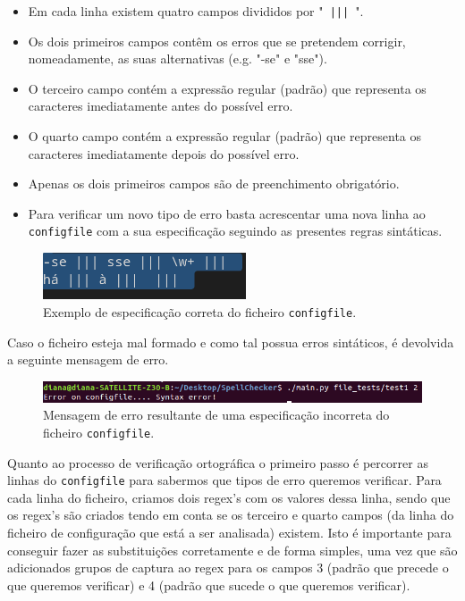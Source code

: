 \documentclass{article}
\begin{document}
\begin{itemize}
    \item Em cada linha existem quatro campos divididos por "\texttt{ ||| }".
    \item Os dois primeiros campos contêm os erros que se pretendem corrigir, nomeadamente, as suas alternativas (e.g. "-se" e "sse").
    \item O terceiro campo contém a expressão regular (padrão) que representa os caracteres imediatamente antes do possível erro.
    \item O quarto campo contém a expressão regular (padrão) que representa os caracteres imediatamente depois do possível erro.
    \item Apenas os dois primeiros campos são de preenchimento obrigatório.
    \item Para verificar um novo tipo de erro basta acrescentar uma nova linha ao \texttt{configfile} com a sua especificação seguindo as presentes regras sintáticas.
\end{itemize}

\begin{figure}[H]
\begin{center}
    \includegraphics[width = 6cm, keepaspectratio]{Pictures/cf.png}
    \caption{Exemplo de especificação correta do ficheiro \texttt{configfile}. }
\end{center}
\end{figure}

Caso o ficheiro esteja mal formado e como tal possua erros sintáticos, é devolvida a seguinte mensagem de erro.

\begin{figure}[H]
\begin{center}
    \includegraphics[width = 16cm, keepaspectratio]{Pictures/errocf.png}
    \caption{Mensagem de erro resultante de uma especificação incorreta do ficheiro \texttt{configfile}. }
\end{center}
\end{figure}

Quanto ao processo de verificação ortográfica o primeiro passo é percorrer as linhas do \texttt{configfile} para sabermos que tipos de erro queremos verificar. Para cada linha do ficheiro, criamos dois regex's com os valores dessa linha, sendo que os regex's são criados tendo em conta se os terceiro e quarto campos (da linha do ficheiro de configuração que está a ser analisada) existem. Isto é importante para conseguir fazer as substituições corretamente e de forma simples, uma vez que são adicionados grupos de captura ao regex para os campos 3 (padrão que precede o que queremos verificar) e 4 (padrão que sucede o que queremos verificar).
\end{document}
